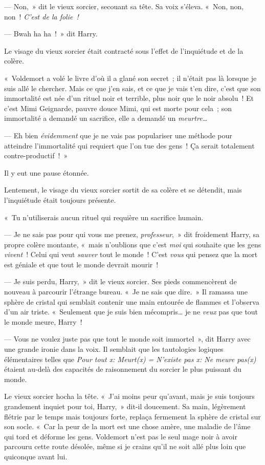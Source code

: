--- Non,~» dit le vieux sorcier, secouant sa tête.
Sa voix s'éleva.
«~Non, non, non~!
\emph{C'est de la folie~!}

--- Bwah ha ha~!~»
dit Harry.

Le visage du vieux sorcier était contracté sous l'effet de l'inquiétude et de la colère.

«~Voldemort a volé le livre d'où il a glané son secret~; il n'était pas là lorsque je suis allé le chercher.
Mais ce que j'en sais, et ce que je vais t'en dire, c'est que son immortalité est née d'un rituel noir et terrible, plus noir que le noir absolu~!
Et c'est Mimi Geignarde, pauvre douce Mimi, qui est morte pour cela~; son immortalité a demandé un sacrifice, elle a demandé un \emph{meurtre…}

--- Eh bien \emph{évidemment} que je ne vais pas populariser une méthode pour atteindre l'immortalité qui requiert que l'on tue des gens~!
Ça serait totalement contre-productif~!~»

Il y eut une pause étonnée.

Lentement, le visage du vieux sorcier sortit de sa colère et se détendit, mais l'inquiétude était toujours présente.

«~Tu n'utiliserais aucun rituel qui requière un sacrifice humain.

--- Je ne sais pas pour qui vous me prenez, \emph{professeur},~» dit froidement Harry, sa propre colère montante, «~mais n'oublions que c'est \emph{moi} qui souhaite que les gens \emph{vivent}~!
Celui qui veut \emph{sauver} tout le monde~!
C'est \emph{vous} qui pensez que la mort est géniale et que tout le monde devrait mourir~!

--- Je suis perdu, Harry,~» dit le vieux sorcier.
Ses pieds commencèrent de nouveau à parcourir l'étrange bureau.
«~Je ne sais que dire.~»
Il ramassa une sphère de cristal qui semblait contenir une main entourée de flammes et l'observa d'un air triste.
«~Seulement que je suis bien mécompris… je ne \emph{veux} pas que tout le monde meure, Harry~!

--- Vous ne voulez juste pas que tout le monde soit immortel~», dit Harry avec une grande ironie dans la voix.
Il semblait que les tautologies logiques élémentaires telles que \emph{Pour tout x: Meurt(x) = N'existe pas x: Ne meure pas(x)} étaient au-delà des capacités de raisonnement du sorcier le plus puissant du monde.

Le vieux sorcier hocha la tête.
«~J'ai moins peur qu'avant, mais je suis toujours grandement inquiet pour toi, Harry,~» dit-il doucement.
Sa main, légèrement flétrie par le temps mais toujours forte, replaça fermement la sphère de cristal sur son socle.
«~Car la peur de la mort est une chose amère, une maladie de l'âme qui tord et déforme les gens.
Voldemort n'est pas le seul mage noir à avoir parcouru cette route désolée, même si je crains qu'il ne soit allé plus loin que quiconque avant lui.

